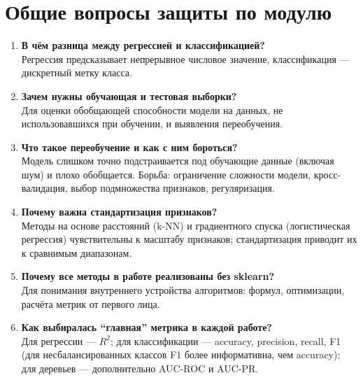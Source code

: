 \documentclass[12pt,a4paper]{article}
\begin{document}
\section{Общие вопросы защиты по модулю}
\begin{enumerate}
\item \textbf{В чём разница между регрессией и классификацией?}\\
Регрессия предсказывает непрерывное числовое значение, классификация --- дискретный метку класса.
\item \textbf{Зачем нужны обучающая и тестовая выборки?}\\
Для оценки обобщающей способности модели на данных, не использовавшихся при обучении, и выявления переобучения.
\item \textbf{Что такое переобучение и как с ним бороться?}\\
Модель слишком точно подстраивается под обучающие данные (включая шум) и плохо обобщается. Борьба: ограничение сложности модели, кросс-валидация, выбор подмножества признаков, регуляризация.
\item \textbf{Почему важна стандартизация признаков?}\\
Методы на основе расстояний (k-NN) и градиентного спуска (логистическая регрессия) чувствительны к масштабу признаков; стандартизация приводит их к сравнимым диапазонам.
\item \textbf{Почему все методы в работе реализованы без sklearn?}\\
Для понимания внутреннего устройства алгоритмов: формул, оптимизации, расчёта метрик от первого лица.
\item \textbf{Как выбиралась ``главная'' метрика в каждой работе?}\\
Для регрессии --- $R^2$; для классификации --- accuracy, precision, recall, F1 (для несбалансированных классов F1 более информативна, чем accuracy); для деревьев --- дополнительно AUC-ROC и AUC-PR.
\end{enumerate}
\end{document}
